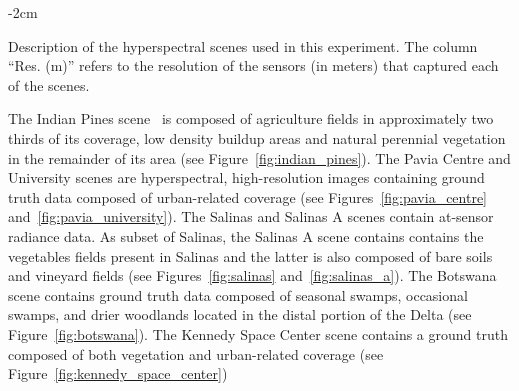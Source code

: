 \documentclass[preprint,12pt]{elsarticle}
\begin{document}
\begin{table}[bp]
    \centering
    \addtolength{\leftskip} {-2cm}
    \addtolength{\rightskip}{-2cm}
    \caption{\label{tab:rs_scene_description}
        Description of the hyperspectral scenes used in this experiment. The
        column ``Res. (m)'' refers to the resolution of the sensors (in
        meters) that captured each of the scenes.}
\end{table}

The Indian Pines scene~\cite{Baumgardner2015} is composed of agriculture fields
in approximately two thirds of its coverage, low density buildup areas and
natural perennial vegetation in the remainder of its area (see
Figure~\ref{fig:indian_pines}). The Pavia Centre and University scenes are
hyperspectral, high-resolution images containing ground truth data composed of
urban-related coverage (see Figures~\ref{fig:pavia_centre}
and~\ref{fig:pavia_university}). The Salinas and Salinas A scenes contain
at-sensor radiance data. As subset of Salinas, the Salinas A scene contains
contains the vegetables fields present in Salinas and the latter is also
composed of bare soils and vineyard fields (see Figures~\ref{fig:salinas}
and~\ref{fig:salinas_a}). The Botswana scene contains ground truth data
composed of seasonal swamps, occasional swamps, and drier woodlands located in
the distal portion of the Delta (see Figure~\ref{fig:botswana}). The Kennedy
Space Center scene contains a ground truth composed of both vegetation and
urban-related coverage (see Figure~\ref{fig:kennedy_space_center})
\end{document}
